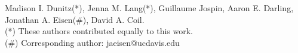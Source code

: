Madison I. Dunitz(*), Jenna M. Lang(*), Guillaume Jospin, Aaron E. Darling, Jonathan A. Eisen(#), David A. Coil. \\(*) These authors contributed equally to this work. \\ (#) Corresponding author: jaeisen@ucdavis.edu
